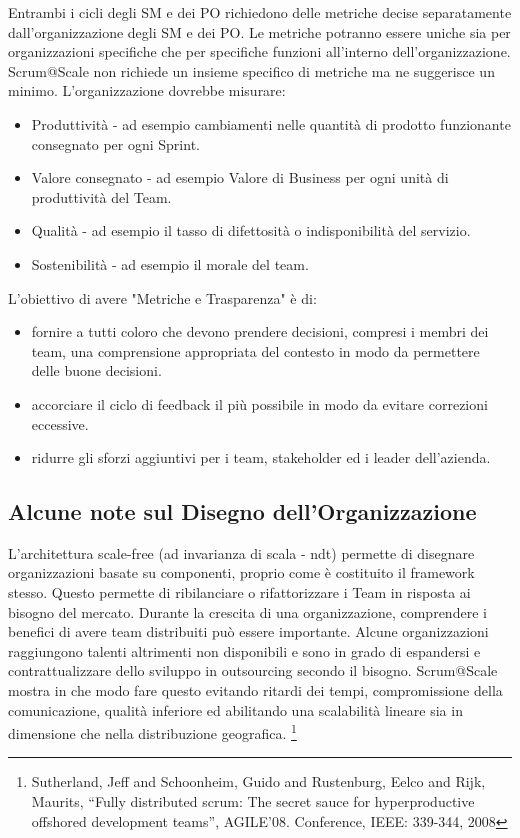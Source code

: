 \documentclass[12pt,a4paper,parskip=full]{scrartcl}
\begin{document}
Entrambi i cicli degli SM e dei PO richiedono delle metriche decise separatamente
dall'organizzazione degli SM e dei PO. Le metriche potranno essere uniche sia per
organizzazioni specifiche che per specifiche funzioni all'interno dell'organizzazione.
Scrum@Scale non richiede un insieme specifico di metriche ma ne suggerisce un
minimo. L'organizzazione dovrebbe misurare:
\begin{itemize}
\item Produttività - ad esempio cambiamenti nelle quantità di prodotto funzionante
consegnato per ogni Sprint.
\item Valore consegnato - ad esempio Valore di Business per ogni unità di produttività del Team.
\item Qualità - ad esempio il tasso di difettosità o indisponibilità del servizio.
\item Sostenibilità - ad esempio il morale del team.
\end{itemize}
L'obiettivo di avere "Metriche e Trasparenza" è di:
\begin{itemize}
 \item fornire a tutti coloro che devono prendere decisioni, compresi i membri dei
 team, una comprensione appropriata del contesto in modo da permettere delle
 buone decisioni.
\item accorciare il ciclo di feedback il più possibile in modo da evitare correzioni eccessive.
\item ridurre gli sforzi aggiuntivi per i team, stakeholder ed i leader dell'azienda.
 \end{itemize}

\subsection{Alcune note sul Disegno dell'Organizzazione}
L'architettura scale-free (ad invarianza di scala - ndt) permette di disegnare organizzazioni
basate su componenti, proprio come è costituito il framework stesso. Questo permette di
ribilanciare o rifattorizzare i Team in risposta ai bisogno del mercato. Durante la crescita
di una organizzazione, comprendere i benefici di avere team distribuiti può essere importante. Alcune organizzazioni raggiungono talenti altrimenti non disponibili e sono
in grado di espandersi e contrattualizzare dello sviluppo in outsourcing secondo il bisogno. Scrum@Scale mostra in che modo fare questo evitando ritardi dei tempi,
compromissione della comunicazione, qualità inferiore ed abilitando una scalabilità
lineare sia in dimensione che nella distribuzione geografica. \footnote{Sutherland, Jeff and Schoonheim, Guido and Rustenburg, Eelco and Rijk, Maurits, ``Fully distributed scrum:
The secret sauce for hyperproductive offshored development teams'',
AGILE'08. Conference, IEEE: 339-344, 2008}
\end{document}
